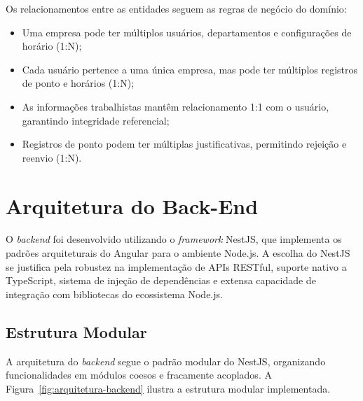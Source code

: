 Os relacionamentos entre as entidades seguem as regras de negócio do domínio:

\begin{itemize}
    \item Uma empresa pode ter múltiplos usuários, departamentos e configurações de horário (1:N);
    \item Cada usuário pertence a uma única empresa, mas pode ter múltiplos registros de ponto e horários (1:N);
    \item As informações trabalhistas mantêm relacionamento 1:1 com o usuário, garantindo integridade referencial;
    \item Registros de ponto podem ter múltiplas justificativas, permitindo rejeição e reenvio (1:N).
\end{itemize}

\section{Arquitetura do Back-End}

O \textit{backend} foi desenvolvido utilizando o \textit{framework} NestJS, que implementa os padrões arquiteturais do Angular para o ambiente Node.js. A escolha do NestJS se justifica pela robustez na implementação de APIs RESTful, suporte nativo a TypeScript, sistema de injeção de dependências e extensa capacidade de integração com bibliotecas do ecossistema Node.js.

\subsection{Estrutura Modular}

A arquitetura do \textit{backend} segue o padrão modular do NestJS, organizando funcionalidades em módulos coesos e fracamente acoplados. A Figura~\ref{fig:arquitetura-backend} ilustra a estrutura modular implementada.


